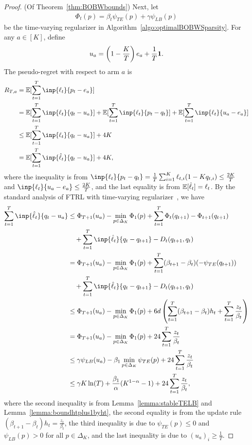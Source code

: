 \begin{proof}(Of Theorem~\ref{thm:BOBWbounds})
    Next, let 
\begin{align}
    \Phi_t(p) = \beta_t \psi_{TE}(p) + \gamma \psi_{LB}(p)
\end{align}
be the time-varying regularizer in Algorithm~\ref{algo:optimalBOBWSparsity}. For any $a \in [K]$, define 
\begin{align*}
    u_a = \left(1 - \frac{K}{T}\right)e_a + \frac{1}{T}\bm{1}.
\end{align*}
The pseudo-regret with respect to arm $a$ is 
\begin{align*}
    R_{T, a} &= \E[\sum_{t=1}^T \inp{\ell_t}{p_t - e_a}] \\
    &= \E[\sum_{t=1}^T \inp{\ell_t}{q_t - u_a}] + \E[\sum_{t=1}^T \inp{\ell_t}{p_t - q_t}] + \E[\sum_{t=1}^T \inp{\ell_t}{u_a - e_a}] \\
    &\leq \E[\sum_{t=1}^T \inp{\ell_t}{q_t - u_a}]  + 4K \\
    &= \E[\sum_{t=1}^T \inp{\hat{\ell}_t}{q_t - u_a}]  + 4K,
\end{align*}
where the inequality is from $\inp{\ell_t}{p_t - q_t} = \frac{1}{T}\sum_{i=1}^K \ell_{t,i}(1-Kq_{t,i}) \leq \frac{2K}{T}$ and 
{$\inp{\ell_t}{u_a - e_a} \leq \frac{2K}{T}$},
and the last equality is from $\mathbb{E}[\hat{\ell}_t] = \ell_t$.
By the standard analysis of FTRL with time-varying regularizer~\citep{BanditAlgorithmsBook2020}, we have
\begin{align*}
    \sum_{t=1}^T \inp{\hat{\ell}_t}{q_t - u_a} &\leq \Phi_{T+1}(u_a) - \min_{p \in \Delta_K} \Phi_1(p) + \sum_{t=1}^T \Phi_t(q_{t+1}) - \Phi_{t+1}(q_{t+1}) \\
    &\quad + \sum_{t=1}^T \inp{\hat{\ell}_t}{q_t - q_{t+1}} - D_t(q_{t+1}, q_t) \\
    &= \Phi_{T+1}(u_a) - \min_{p \in \Delta_K} \Phi_1(p) + \sum_{t=1}^T (\beta_{t+1} - \beta_t)(-\psi_{TE}(q_{t+1})) \\
    &\quad + \sum_{t=1}^T \inp{\hat{\ell}_t}{q_t - q_{t+1}} - D_t(q_{t+1}, q_t) \\
    &\leq \Phi_{T+1}(u_a) - \min_{p \in \Delta_K} \Phi_1(p) + 6d\left(\sum_{t=1}^T (\beta_{t+1} - \beta_t)h_t + \sum_{t=1}^T \frac{z_t}{\beta_t}\right) \\
    &= \Phi_{T+1}(u_a) - \min_{p \in \Delta_K} \Phi_1(p)  + 24\sum_{t=1}^T \frac{z_t}{\beta_t} \\
    &\leq \gamma \psi_{LB}(u_a) - \beta_1\min_{p \in \Delta_K} \psi_{TE}(p) + 24\sum_{t=1}^T \frac{z_t}{\beta_t} \\
    &\leq \gamma K\ln(T) + \frac{\beta_1}{\alpha}(K^{1-\alpha}-1) + 24\sum_{t=1}^T \frac{z_t}{\beta_t},
\end{align*}
where the second inequality is from Lemma~\ref{lemma:stableTELB} and Lemma~\ref{lemma:boundhtplus1byht}, the second equality is from the update rule $(\beta_{t+1} - \beta_t)h_t = \frac{z_t}{\beta_t}$, the third inequality is due to 
{$\psi_{TE}(p) \leq 0$} and $\psi_{LB}(p) > 0$ for all $p \in \Delta_K$, and the last inequality is due to $(u_a)_{i} \geq \frac{1}{T}$.


\end{proof}
